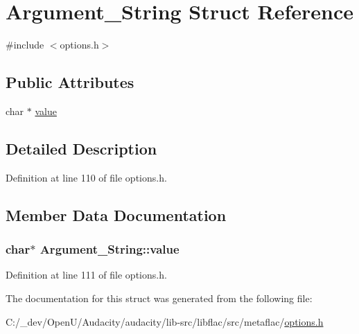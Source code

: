 \hypertarget{struct_argument___string}{}\section{Argument\+\_\+\+String Struct Reference}
\label{struct_argument___string}


{\ttfamily \#include $<$options.\+h$>$}

\subsection*{Public Attributes}
\begin{DoxyCompactItemize}
\item 
char $\ast$ \hyperlink{struct_argument___string_af29c249e4c59a38e09da2189ab980c8d}{value}
\end{DoxyCompactItemize}


\subsection{Detailed Description}


Definition at line 110 of file options.\+h.



\subsection{Member Data Documentation}
\subsubsection[{\texorpdfstring{value}{value}}]{\setlength{\rightskip}{0pt plus 5cm}char$\ast$ Argument\+\_\+\+String\+::value}\hypertarget{struct_argument___string_af29c249e4c59a38e09da2189ab980c8d}{}\label{struct_argument___string_af29c249e4c59a38e09da2189ab980c8d}


Definition at line 111 of file options.\+h.



The documentation for this struct was generated from the following file\+:\begin{DoxyCompactItemize}
\item 
C\+:/\+\_\+dev/\+Open\+U/\+Audacity/audacity/lib-\/src/libflac/src/metaflac/\hyperlink{libflac_2src_2metaflac_2options_8h}{options.\+h}\end{DoxyCompactItemize}
